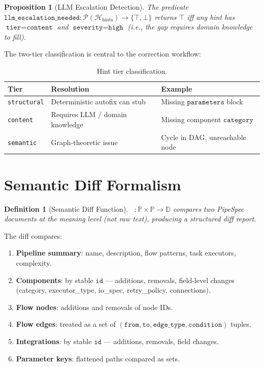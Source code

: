 \documentclass[11pt,a4paper]{article}
\newtheorem{definition}{Definition}[section]
\newtheorem{proposition}{Proposition}[section]
\theoremstyle{definition}
\DeclareMathOperator{\DiffP}{\Delta_P}
\newcommand{\pspace}{\mathbb{P}}
\newcommand{\hintspace}{\mathcal{H}_{\text{hints}}}
\newcommand{\dspace}{\mathbb{D}}
\begin{document}
\begin{proposition}[LLM Escalation Detection]
The predicate $\texttt{llm\_escalation\_needed} : \mathcal{P}(\hintspace) \to \{\top, \bot\}$ returns $\top$ iff any hint has $\texttt{tier} = \texttt{content}$ and $\texttt{severity} = \texttt{high}$ (i.e., the gap requires domain knowledge to fill).
\end{proposition}

The two-tier classification is central to the correction workflow:

\begin{table}[htbp]
\centering
\caption{Hint tier classification.}
\label{tab:hints}
\begin{tabular}{@{}lll@{}}
\toprule
\textbf{Tier} & \textbf{Resolution} & \textbf{Example} \\
\midrule
\texttt{structural} & Deterministic autofix can stub & Missing $\texttt{parameters}$ block \\
\texttt{content}    & Requires LLM / domain knowledge & Missing component $\texttt{category}$ \\
\texttt{semantic}   & Graph-theoretic issue  & Cycle in DAG, unreachable node \\
\bottomrule
\end{tabular}
\end{table}

\section{Semantic Diff Formalism}

\begin{definition}[Semantic Diff Function]
$\DiffP : \pspace \times \pspace \to \dspace$ compares two PipeSpec documents at the meaning level (not raw text), producing a structured diff report.
\end{definition}

The diff compares:
\begin{enumerate}[label=(\alph*),leftmargin=*]
    \item \textbf{Pipeline summary}: name, description, flow patterns, task executors, complexity.
    \item \textbf{Components}: by stable $\texttt{id}$ — additions, removals, field-level changes (category, executor\_type, io\_spec, retry\_policy, connections).
    \item \textbf{Flow nodes}: additions and removals of node IDs.
    \item \textbf{Flow edges}: treated as a set of $(\texttt{from}, \texttt{to}, \texttt{edge\_type}, \texttt{condition})$ tuples.
    \item \textbf{Integrations}: by stable $\texttt{id}$ — additions, removals, field changes.
    \item \textbf{Parameter keys}: flattened paths compared as sets.
\end{enumerate}
\end{document}
